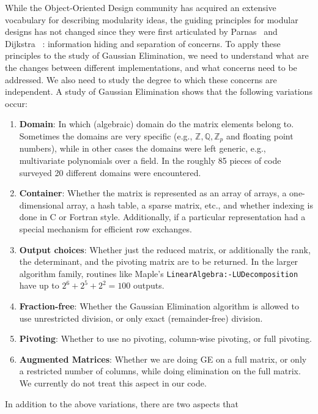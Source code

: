 \documentclass{llncs}
\begin{document}
While the Object-Oriented Design community has acquired an extensive
vocabulary for describing modularity ideas, the guiding principles for
modular designs has not changed since they were first articulated by
Parnas~\cite{journals/cacm/parnas72a} and Dijkstra~
\cite{EWD:EWD447}: information hiding and separation of concerns.  To
apply these principles to the study of Gaussian Elimination, we need
to understand what are the changes between different implementations, and 
what concerns need to be addressed.  We also need to study the degree
to which these concerns are independent.
A study of Gaussian Elimination \cite{carette04} shows that
the following variations occur:
\begin{enumerate}
\vspace*{-6pt}
	\item \textbf{Domain}: In which (algebraic) domain do the
	  matrix elements belong to.  Sometimes the domains are very
	  specific (e.g., $\mathbb{Z}, \mathbb{Q}, \mathbb{Z}_p$ and
	  floating point numbers), while in other cases the domains
	  were left generic, e.g., multivariate polynomials over a
	  field.  In the roughly 85 pieces of code surveyed
	  \cite{carette04} 20 different domains were encountered.
	\item \textbf{Container}: Whether the matrix is represented as
	  an array of arrays, a one-dimensional array, a hash table, a
	  sparse matrix, etc., and whether indexing is done in C or
	  Fortran style.  Additionally, if a particular representation
	  had a special mechanism for efficient row exchanges.
	\item \textbf{Output choices}: Whether just the reduced
	  matrix, or additionally the rank, the determinant, and the
	  pivoting matrix are to be returned. In the larger algorithm
	  family, routines like Maple's
	  \texttt{LinearAlgebra:-LUDecomposition} have up to $2^6 +
	  2^5 + 2^2 = 100$ outputs.
	\item \textbf{Fraction-free}: Whether the Gaussian Elimination
		algorithm is allowed to use unrestricted division, or only
		exact (remainder-free) division.
	\item \textbf{Pivoting}: Whether to use no pivoting, 
		column-wise pivoting, or full pivoting.
	\item \textbf{Augmented Matrices}: Whether we are doing GE on
		a full matrix, or only a restricted number of columns, while
		doing elimination on the full matrix.  We currently
		do not treat this aspect in our code.
\end{enumerate}
\noindent In addition to the above variations, there are two aspects that 
\end{document}
